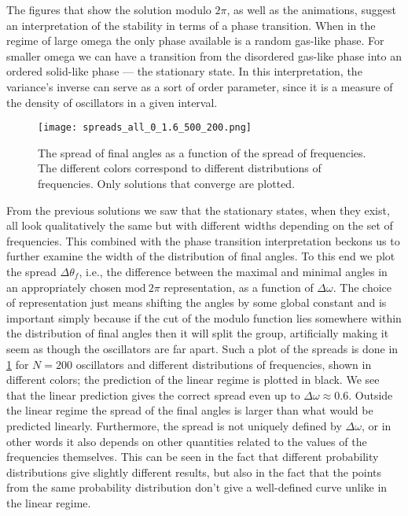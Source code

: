 \documentclass[10pt,a4paper,twocolumn]{article}
\begin{document}
The figures that show the solution modulo $2\pi$, as well as the animations, suggest an interpretation of the stability in terms of a phase transition. When in the regime of large omega the only phase available is a random gas-like phase. For smaller omega we can have a transition from the disordered gas-like phase into an ordered solid-like phase --- the stationary state. In this interpretation, the variance's inverse can serve as a sort of order parameter, since it is a measure of the density of oscillators in a given interval.  

\begin{figure}[!h]
    \centering
    \texttt{[image: spreads\_all\_0\_1.6\_500\_200.png]}
    \caption{The spread of final angles as a function of the spread of frequencies. The different colors correspond to different distributions of frequencies. Only solutions that converge are plotted.}
    \label{fig:spreads_500_200}
\end{figure}

From the previous solutions we saw that the stationary states, when they exist, all look qualitatively the same but with different widths depending on the set of frequencies. This combined with the phase transition interpretation beckons us to further examine the width of the distribution of final angles. To this end we plot the spread $\Delta \theta_f$, i.e., the difference between the maximal and minimal angles in an appropriately chosen $\mathrm{mod} \ 2\pi$ representation, as a function of $\Delta \omega$. The choice of representation just means shifting the angles by some global constant and is important simply because if the cut of the modulo function lies somewhere within the distribution of final angles then it will split the group, artificially making it seem as though the oscillators are far apart. Such a plot of the spreads is done in \cref{fig:spreads_500_200} for $N=200$ oscillators and different distributions of frequencies, shown in different colors; the prediction of the linear regime is plotted in black. We see that the linear prediction gives the correct spread even up to $\Delta \omega \approx 0.6$. Outside the linear regime the spread of the final angles is larger than what would be predicted linearly. Furthermore, the spread is not uniquely defined by $\Delta \omega$, or in other words it also depends on other quantities related to the values of the frequencies themselves. This can be seen in the fact that different probability distributions give slightly different results, but also in the fact that the points from the same probability distribution don't give a well-defined curve unlike in the linear regime.
\end{document}
